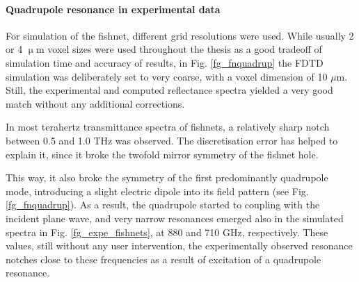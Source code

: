 \paragraph{Quadrupole resonance in experimental data}%
For simulation of the fishnet, different grid resolutions were used. While usually 2 or 4 $\upmu$m voxel sizes were used throughout the thesis as a good tradeoff of simulation time and accuracy of results, in Fig.  \ref{fg_fnquadrup} the FDTD simulation was deliberately set to very coarse, with a voxel dimension of 10 $\mu$m. Still, the experimental and computed reflectance spectra yielded a very good match without any additional corrections.

In most terahertz transmittance spectra of fishnets, a relatively sharp notch between 0.5 and 1.0 THz was observed. The discretisation error has helped to explain it, since it broke the twofold mirror symmetry of the fishnet hole. 

This way, it also broke the symmetry of the first predominantly quadrupole mode, introducing a slight electric dipole into its field pattern  (see Fig. \ref{fg_fnquadrup}). As a result, the quadrupole started to coupling with the incident plane wave, and very narrow resonances emerged also in the simulated spectra in Fig. \ref{fg_expe_fishnets}, at 880 and 710 GHz, respectively. These values, still without any user intervention, the experimentally observed resonance notches close to these frequencies as a result of excitation of a quadrupole resonance.   %




